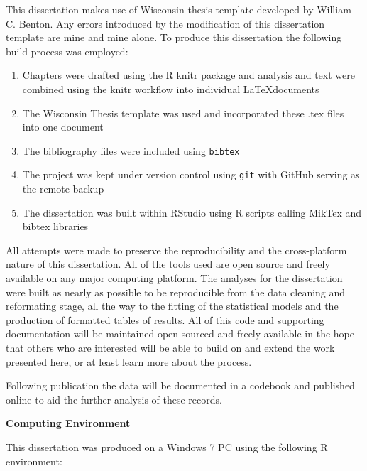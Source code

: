 This dissertation makes use of Wisconsin thesis template developed by William C. Benton. 
Any errors introduced by the modification of this dissertation template are mine and 
mine alone. To produce this dissertation the following build process was employed: 

\begin{enumerate}
\item Chapters were drafted using the R knitr package and analysis and text were 
combined using the knitr workflow into individual \LaTeX documents
\item The Wisconsin Thesis template was used and incorporated these .tex files 
into one document
\item The bibliography files were included using \texttt{bibtex}
\item The project was kept under version control using 
\texttt{git} with GitHub serving as the remote backup
\item The dissertation was built within RStudio using R scripts calling MikTex 
and bibtex libraries
\end{enumerate}

All attempts were made to preserve the reproducibility and the cross-platform 
nature of this dissertation. All of the tools used are open source and freely 
available on any major computing platform. The analyses for the dissertation 
were built as nearly as possible to be reproducible from the data cleaning and 
reformating stage, all the way to the fitting of the statistical models and the 
production of formatted tables of results. All of this code and supporting 
documentation will be maintained open sourced and freely available in the hope 
that others who are interested will be able to build on and extend the work 
presented here, or at least learn more about the process. 

Following publication the data will be documented in a codebook and published 
online to aid the further analysis of these records. 

\textbf{Computing Environment}

This dissertation was produced on a Windows 7 PC using the following R 
environment:

